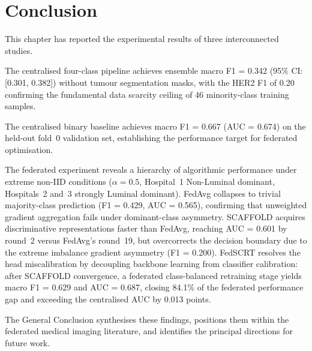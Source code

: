 \section{Conclusion}
\label{sec:ch4-conclusion}

This chapter has reported the experimental results of
three interconnected studies.

The centralised four-class pipeline achieves ensemble
macro F1 = 0.342 (95\% CI: [0.301, 0.382]) without
tumour segmentation masks, with the HER2 F1 of 0.20
confirming the fundamental data scarcity ceiling of
46 minority-class training samples.

The centralised binary baseline achieves macro F1 = 0.667
(AUC = 0.674) on the held-out fold~0 validation set,
establishing the performance target for federated
optimisation.

The federated experiment reveals a hierarchy of
algorithmic performance under extreme non-IID conditions
($\alpha=0.5$, Hospital~1 Non-Luminal dominant,
Hospitals~2 and~3 strongly Luminal dominant).
FedAvg collapses to trivial majority-class prediction
(F1 = 0.429, AUC = 0.565), confirming that unweighted
gradient aggregation fails under dominant-class asymmetry.
SCAFFOLD acquires discriminative representations faster
than FedAvg, reaching AUC = 0.601 by round~2 versus
FedAvg's round~19, but overcorrects the decision
boundary due to the extreme imbalance gradient asymmetry
(F1 = 0.200).
FedSCRT resolves the head miscalibration by decoupling
backbone learning from classifier calibration: after
SCAFFOLD convergence, a federated class-balanced retraining
stage yields macro F1 = 0.629 and AUC = 0.687, closing
84.1\% of the federated performance gap and exceeding the
centralised AUC by 0.013 points.

The General Conclusion synthesises these findings,
positions them within the federated medical imaging
literature, and identifies the principal directions
for future work.
